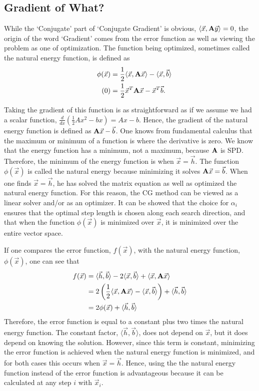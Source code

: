 \documentclass[11pt,letterpaper,oneside,notitlepage]{article}	%
\newcommand{\bfa}{{\bf A}}						%
\newcommand{\ip}[2]{\langle \vec #1,\vec #2 \rangle}	%
\newcommand{\aip}[2]{\langle \vec #1,\bfa\vec #2 \rangle}	%
\newcommand{\yestag}{\tag{\theequation}\stepcounter{equation}}	%
\newcommand{\pindent}[1]{\hspace{6mm}}  		%
\numberwithin{equation}{section}				%
\begin{document}
\subsection{Gradient of What?}%
\pindent{}While the `Conjugate' part of `Conjugate Gradient' is obvious, $\aip{x}{y}=0$,
the origin of the word `Gradient' comes from the error function as well as viewing the problem as one of optimization. The function being optimized, sometimes called the natural energy function\cite{VideoLecture}, is defined as
\begin{align*}
\phi(\vec x) &= \frac{1}{2}\aip{x}{x}-\ip{x}{b} \\ \yestag
&= \frac{1}{2}\vec x^T\bfa\vec x - \vec x^T\vec b
.\end{align*}

Taking the gradient of this function is as straightforward as if we assume we had a scalar function, $\frac{d}{dx}(\frac{1}{2}Ax^2-bx)=Ax-b$\cite{VideoLecture}. Hence, the gradient of the natural energy function is defined as $\bfa \vec x - \vec b$. One knows from fundamental calculus that the maximum or minimum of a function is where the derivative is zero. We know that the energy function has a minimum, not a maximum, because $\bfa$ is SPD. Therefore, the minimum of the energy function is when $\vec x = \vec h$. The function $\phi(\vec x)$ is called the natural energy because minimizing it solves $\bfa\vec x = \vec b$. When one finds $\vec x = \vec h$, he has solved the matrix equation as well as optimized the natural energy function. For this reason, the CG method can be viewed as a linear solver and/or as an optimizer. It can be showed that the choice for $\alpha_i$ ensures that the optimal step length is chosen along each search direction, and that when the function $\phi(\vec x)$ is minimized over $\vec x$, it is minimized over the entire vector space\cite{Trefethen97}.

If one compares the error function, $f(\vec x)$, with the natural energy function, $\phi(\vec x)$, one can see that
\begin{align*}
f(\vec x) &=\ip{h}{b}-2\ip{x}{b}+\aip{x}{x} \\
&=2\left(\frac{1}{2}\aip{x}{x}-\ip{x}{b}\right)+\ip{h}{b} \\
&= 2\phi(\vec x)+\ip{h}{b}
\end{align*}
Therefore, the error function is equal to a constant plus two times the natural energy function. The constant factor, $\ip{h}{b}$, does not depend on $\vec x$, but it does depend on knowing the solution. However, since this term is constant, minimizing the error function is achieved when the natural energy function is minimized, and for both cases this occurs when $\vec x = \vec h$\cite{Trefethen97}.  Hence, using the the natural energy function instead of the error function is advantageous because it can be calculated at any step $i$ with $\vec x_i$.
\end{document}
